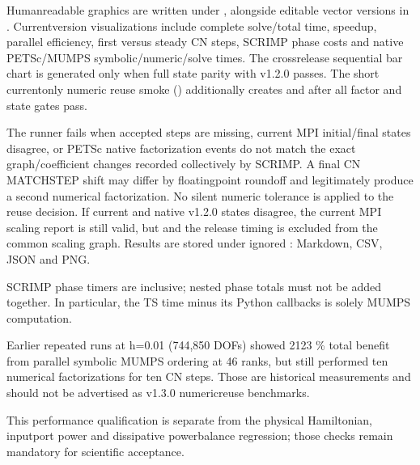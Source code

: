\documentclass[letterpaper,10pt,english]{sphinxmanual}
\begin{document}
\sphinxAtStartPar
Human\sphinxhyphen{}readable graphics are written under
, alongside editable vector versions in
. Current\sphinxhyphen{}version visualizations include complete solve/total
time, speedup, parallel efficiency, first versus steady CN steps,
SCRIMP phase costs and native PETSc/MUMPS symbolic/numeric/solve times.
The cross\sphinxhyphen{}release sequential bar chart is generated only when full
state parity with v1.2.0 passes. The short current\sphinxhyphen{}only numeric reuse
smoke () additionally
creates  and
 after all factor and state gates pass.

\sphinxAtStartPar
The runner fails when accepted steps are missing, current MPI
initial/final states disagree, or PETSc native factorization events
do not match the exact graph/coefficient changes recorded collectively
by SCRIMP. A final CN MATCHSTEP shift may differ by floating\sphinxhyphen{}point
roundoff and legitimately produce a second numerical factorization.
No silent numeric tolerance is applied to the reuse decision. If current and native v1.2.0
states disagree, the current MPI scaling report is still valid,
but  and the
release timing is excluded from the common scaling graph. Results
are stored under ignored : Markdown, CSV, JSON
and PNG.

\sphinxAtStartPar
{} SCRIMP phase timers are inclusive; nested phase totals
must not be added together. In particular, the TS time minus its
Python callbacks is  solely MUMPS computation.

\sphinxAtStartPar
Earlier repeated runs at h=0.01 (744,850 DOFs) showed 21\textendash{}23 \% total
benefit from parallel symbolic MUMPS ordering at 4\textendash{}6 ranks, but still
performed ten numerical factorizations for ten CN steps. Those are
historical measurements and should not be advertised as v1.3.0
numeric\sphinxhyphen{}reuse benchmarks.

\sphinxAtStartPar
This performance qualification is separate from the physical
Hamiltonian, input\sphinxhyphen{}port power and dissipative power\sphinxhyphen{}balance regression;
those checks remain mandatory for scientific acceptance.
\end{document}
